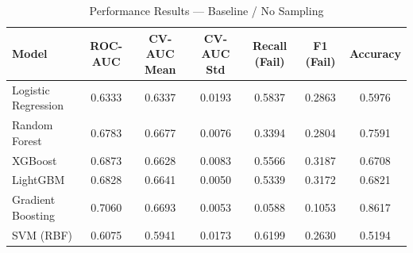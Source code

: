 \begin{table}[htbp]
\caption{Performance Results — Baseline / No Sampling}
\label{tab:baseline_none}
\begin{tabular}{lcccccc}
\toprule

Model & ROC-AUC & CV-AUC Mean & CV-AUC Std & Recall (Fail) & F1 (Fail) & Accuracy \\
\midrule

Logistic Regression & 0.6333 & 0.6337 & 0.0193 & 0.5837 & 0.2863 & 0.5976 \\
Random Forest & 0.6783 & 0.6677 & 0.0076 & 0.3394 & 0.2804 & 0.7591 \\
XGBoost & 0.6873 & 0.6628 & 0.0083 & 0.5566 & 0.3187 & 0.6708 \\
LightGBM & 0.6828 & 0.6641 & 0.0050 & 0.5339 & 0.3172 & 0.6821 \\
Gradient Boosting & 0.7060 & 0.6693 & 0.0053 & 0.0588 & 0.1053 & 0.8617 \\
SVM (RBF) & 0.6075 & 0.5941 & 0.0173 & 0.6199 & 0.2630 & 0.5194 \\
\bottomrule

\end{tabular}
\end{table}
